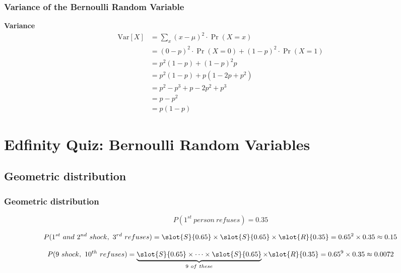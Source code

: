 \documentclass[slidestop,compress,mathserif]{beamer}
\newcommand{\soln}[1]{\textit{#1}}
\begin{document}
\begin{frame}
\frametitle{Variance of the Bernoulli Random Variable}
\begin{center}
\textbf{Variance}
\begin{align*}
\mathrm{Var}[X] &= \sum_x (x - \mu)^2 \cdot \Pr(X = x) \\
    &= (0 - p)^2 \cdot \Pr(X=0) + (1 - p)^2 \cdot \Pr(X=1) \\
    &= p^2 (1-p) + (1-p)^2 p \\
    &= p^2 (1-p) + p(1 - 2p + p^2) \\
    &= p^2 - p^3 + p - 2p^2 + p^3 \\
    &= p - p^2 \\
    &= p(1-p)
\end{align*}
\end{center}
\end{frame}

\section{Edfinity Quiz: Bernoulli Random Variables}


\subsection{Geometric distribution}


\begin{frame}
\frametitle{Geometric distribution}

{\small


\[ P(1^{st}~person~refuses) = 0.35 \]

\pause

\[ P(1^{st}~and~2^{nd}~shock,~3^{rd}~refuses) = \slot{S}{0.65} \times \slot{S}{0.65} \times  \slot{R}{0.35} = 0.65^2 \times 0.35 \approx 0.15 \]

\pause

\soln{
\pause
\[ P(9~shock,~10^{th}~refuses) = \underbrace{\slot{S}{0.65} \times \cdots \times \slot{S}{0.65}}_{9~of~these} \times  \slot{R}{0.35} = 0.65^9 \times 0.35 \approx 0.0072 \]
}
}

\end{frame}
\end{document}
